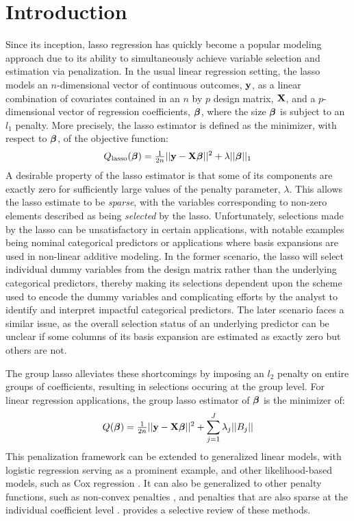 \section{Introduction}

Since its inception, lasso regression \citep{tibshirani_1996} has quickly become a popular modeling approach due to its ability to simultaneously achieve variable selection and estimation via penalization. In the usual linear regression setting, the lasso models an $n$-dimensional vector of continuous outcomes, $\mathbf{y}$, as a linear combination of covariates contained in an $n$ by $p$ design matrix, $\mathbf{X}$, and a $p$-dimensional vector of regression coefficients, $\boldsymbol{\beta}$, where the size $\boldsymbol{\beta}$ is subject to an $l_1$ penalty. More precisely, the lasso estimator is defined as the minimizer, with respect to $\boldsymbol{\beta}$, of the objective function:
\begin{equation*}
Q_{\text{lasso}}(\boldsymbol{\beta}) = \tfrac{1}{2n}||\mathbf{y} - \mathbf{X}\boldsymbol{\beta}||^2 + \lambda||\boldsymbol{\beta}||_1
\end{equation*}
A desirable property of the lasso estimator is that some of its components are exactly zero for sufficiently large values of the penalty parameter, $\lambda$. This allows the lasso estimate to be \textit{sparse}, with the variables corresponding to non-zero elements described as being \textit{selected} by the lasso. Unfortunately, selections made by the lasso can be unsatisfactory in certain applications, with notable examples being nominal categorical predictors or applications where basis expansions are used in non-linear additive modeling. In the former scenario, the lasso will select individual dummy variables from the design matrix rather than the underlying categorical predictors, thereby making its selections dependent upon the scheme used to encode the dummy variables and complicating efforts by the analyst to identify and interpret impactful categorical predictors. The later scenario faces a similar issue, as the overall selection status of an underlying predictor can be unclear if some columns of its basis expansion are estimated as exactly zero but others are not.

The group lasso \citep{Yuan2006} alleviates these shortcomings by imposing an $l_2$ penalty on entire groups of coefficients, resulting in selections occuring at the group level. For linear regression applications, the group lasso estimator of $\boldsymbol{\beta}$ is the minimizer of:
\begin{equation*}
Q(\boldsymbol{\beta}) = \tfrac{1}{2n}||\mathbf{y} - \mathbf{X}\boldsymbol{\beta}||^2 + \sum_{j = 1}^{J}\lambda_j ||B_j||
\end{equation*}
This penalization framework can be extended to generalized linear models, with logistic regression \citep{meier2008} serving as a prominent example, and other likelihood-based models, such as Cox regression \citep{Wang2009}. It can also be generalized to other penalty functions, such as non-convex penalties \citep{Breheny2012}, and penalties that are also sparse at the individual coefficient level \citep{Simon2013b}. \citet{Huang2012} provides a selective review of these methods.

